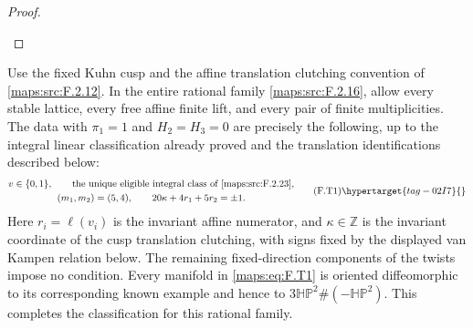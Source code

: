 \begin{proof}
\begin{enumerate}[label={$\langle1\rangle$\arabic*.}]
\end{enumerate}
\end{proof}




\begin{theorem}\hypertarget{tag-02NE}{}\label{maps:src:F.2.24}


Use the fixed Kuhn cusp and the affine translation clutching
convention of \ref{maps:src:F.2.12}.  In the entire rational family \ref{maps:src:F.2.16},
allow every stable lattice, every free affine finite lift,
and every pair of finite multiplicities.
The data with $\pi_1=1$ and $H_2=H_3=0$ are precisely the
following, up to the integral linear classification already
proved and the translation identifications described below:
\[
\begin{gathered}
 v\in\{0,1\},\qquad
 \text{the unique eligible integral class of \ref{maps:src:F.2.23}},\\
 (m_1,m_2)=(5,4),\qquad
 20\kappa+4r_1+5r_2=\pm1.
\end{gathered}
 \tag{F.T1}\hypertarget{tag-02I7}{}\label{maps:eq:F.T1}
\]
Here $r_i=\ell(v_i)$ is the invariant affine numerator, and
$\kappa\in\mathbb Z$ is the invariant coordinate of the
cusp translation clutching, with signs fixed by the displayed
van Kampen relation below.  The remaining fixed-direction
components of the twists impose no condition.
Every manifold in \eqref{maps:eq:F.T1} is oriented diffeomorphic to its corresponding known example and hence to
$3\mathbb{HP}^2\#(-\mathbb{HP}^2)$.
This completes the classification for this rational family.

\end{theorem}


